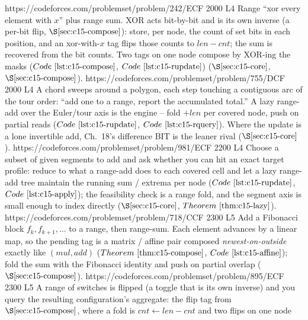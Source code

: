 \begin{mixedset}
    {https://codeforces.com/problemset/problem/242/E}{CF 2000 L4}
    {Range ``xor every element with \(x\)'' plus range sum. XOR acts bit-by-bit and is
     its own inverse (a per-bit flip, \(\secref{c15-compose}\)): store, per node, the
     count of set bits in each position, and an xor-with-\(x\) tag flips those counts to
     \(\mathit{len}-\mathit{cnt}\); the sum is recovered from the bit counts. Two tags on
     one node compose by XOR-ing the masks (\(\coderef{c15-compose}\), \(\coderef{c15-rupdate}\))
     (\(\secref{c15-core}\), \(\secref{c15-compose}\)).}
    {https://codeforces.com/problemset/problem/755/D}{CF 2000 L4}
    {A chord sweeps around a polygon, each step touching a contiguous arc of the tour
     order: ``add one to a range, report the accumulated total.'' A lazy range-add over
     the Euler/tour axis is the engine -- fold \(+\mathit{len}\) per covered node, push on
     partial reads (\(\coderef{c15-rupdate}\), \(\coderef{c15-rquery}\)). Where the update is a
     lone invertible add, Ch.~18's difference BIT is the leaner rival (\(\secref{c15-core}\)).}
    {https://codeforces.com/problemset/problem/981/E}{CF 2200 L4}
    {Choose a subset of given segments to add and ask whether you can hit an exact target
     profile: reduce to what a range-add does to each covered cell and let a lazy
     range-add tree maintain the running sum / extrema per node (\(\coderef{c15-rupdate}\),
     \(\coderef{c15-apply}\)); the feasibility check is a range fold, and the segment axis
     is small enough to index directly (\(\secref{c15-core}\), \(\thmref{c15-lazy}\)).}
    {https://codeforces.com/problemset/problem/718/C}{CF 2300 L5}
    {Add a Fibonacci block \(f_k,f_{k+1},\dots\) to a range, then range-sum. Each
     element advances by a linear map, so the pending tag is a matrix / affine pair
     composed \emph{newest-on-outside} exactly like \((\mathit{mul},\mathit{add})\)
     (\(\thmref{c15-compose}\), \(\coderef{c15-affine}\)); fold the sum with the Fibonacci
     identity and push on partial overlap (\(\secref{c15-compose}\)).}
    {https://codeforces.com/problemset/problem/895/E}{CF 2300 L5}
    {A range of switches is flipped (a toggle that is its own inverse) and you query the
     resulting configuration's aggregate: the flip tag from \(\secref{c15-compose}\), where
     a fold is \(\mathit{cnt}\leftarrow\mathit{len}-\mathit{cnt}\) and two flips on one node
}
\end{mixedset}
